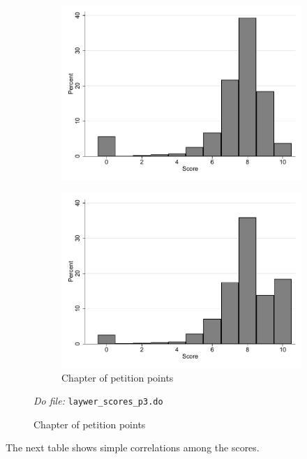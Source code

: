 \documentclass[oneside,11pt]{article}
\begin{document}
\begin{figure}[H]
\begin{center}
\begin{subfigure}{0.49\textwidth}
        \includegraphics[width=\textwidth]{Figuras/hist_calif_derechos.pdf}
    \end{subfigure}    
 \begin{subfigure}{0.49\textwidth}
        \caption{Chapter of petition points}
        \centering
        \includegraphics[width=\textwidth]{Figuras/hist_calif_puntos_petitorios.pdf}
    \end{subfigure}      
    \end{center}
    \scriptsize{ \noindent 
    \textit{Do file: }  \texttt{laywer\_scores\_p3.do}}

\end{figure}


The next table shows simple correlations among the scores.
\end{document}
